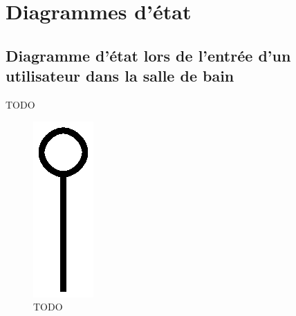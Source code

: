 \chapter{Diagrammes d'état}
\section{Diagramme d'état lors de l'entrée d'un utilisateur dans la salle de bain}
TODO
\begin{figure}[H]
	\centering
	\includegraphics[width=1\linewidth]{diagrams/bathroom/diagramme_etat_st.eps}
	\caption{TODO}
	\label{fig:diagramme_st}
\end{figure}

